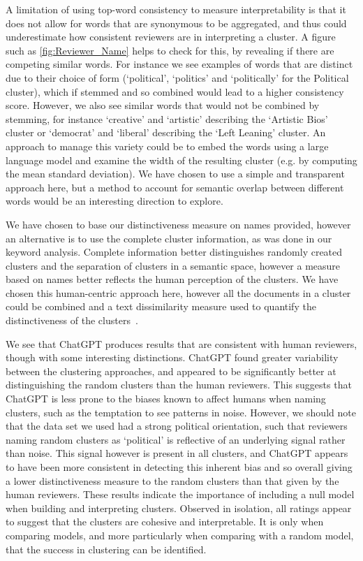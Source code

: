 \documentclass{article}
\begin{document}
A limitation of using top-word consistency to measure interpretability is that it does not allow for words that are synonymous to be aggregated, and thus could underestimate how consistent reviewers are in interpreting a cluster. A figure such as \ref{fig:Reviewer_Name} helps to check for this, by revealing if there are competing similar words.  For instance we see examples of words that are distinct due to their choice of form (`political', `politics' and `politically' for the Political cluster), which if stemmed and so combined would lead to a higher consistency score. 
 However, we also see similar words that would not be combined by stemming, for instance `creative' and `artistic' describing the `Artistic Bios' cluster or `democrat' and `liberal' describing the `Left Leaning' cluster.  An approach to manage this variety could be to embed the words using a large language model and examine the width of the resulting cluster (e.g. by computing the mean standard deviation).  We have chosen to use a simple and transparent approach here, but a method to account for semantic overlap between different words would be an interesting direction to explore.

We have chosen to base our distinctiveness measure on names provided, however an alternative is to use the complete cluster information, as was done in our keyword analysis.  Complete information better distinguishes randomly created clusters and the separation of clusters in a semantic space, however a measure based on names better reflects the human perception of the clusters.  We have chosen this human-centric approach here, however all the documents in a cluster could be combined and a text dissimilarity measure used to quantify the distinctiveness of the clusters~\cite{shade2023}.

We see that ChatGPT produces results that are consistent with human reviewers, though with some interesting distinctions.  ChatGPT found greater variability between the clustering approaches, and appeared to be significantly better at distinguishing the random clusters than the human reviewers.  This suggests that ChatGPT is less prone to the biases known to affect humans when naming clusters, such as the temptation to see patterns in noise.  However, we should note that the data set we used had a strong political orientation, such that reviewers naming random clusters as `political' is reflective of an underlying signal rather than noise.  This signal however is present in all clusters, and ChatGPT appears to have been more consistent in detecting this inherent bias and so overall giving a lower distinctiveness measure to the random clusters than that given by the human reviewers.  These results indicate the importance of including a null model when building and interpreting clusters.  Observed in isolation, all ratings appear to suggest that the clusters are cohesive and interpretable.  It is only when comparing models, and more particularly when comparing with a random model, that the success in clustering can be identified.
\end{document}
